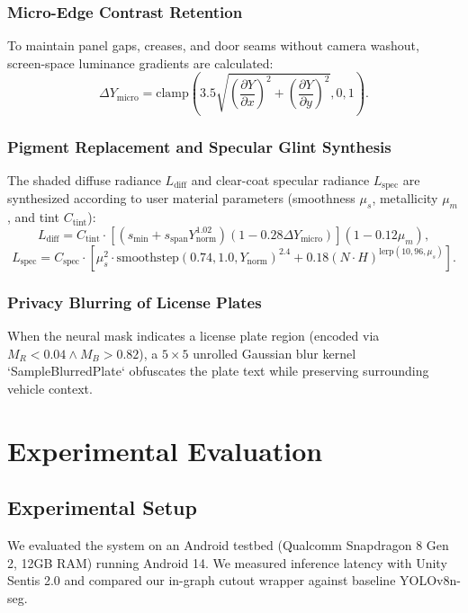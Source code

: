 \documentclass[10pt,journal,compsoc]{IEEEtran}
\begin{document}
\subsubsection{Micro-Edge Contrast Retention}
To maintain panel gaps, creases, and door seams without camera washout, screen-space luminance gradients are calculated:
\begin{equation}
    \Delta Y_{\text{micro}} = \text{clamp}\left(3.5 \sqrt{\left(\frac{\partial Y}{\partial x}\right)^2 + \left(\frac{\partial Y}{\partial y}\right)^2}, 0, 1\right).
\end{equation}

\subsubsection{Pigment Replacement and Specular Glint Synthesis}
The shaded diffuse radiance $L_{\text{diff}}$ and clear-coat specular radiance $L_{\text{spec}}$ are synthesized according to user material parameters (smoothness $\mu_s$, metallicity $\mu_m$, and tint $C_{\text{tint}}$):
\begin{equation}
    L_{\text{diff}} = C_{\text{tint}} \cdot \left[ (s_{\min} + s_{\text{span}} Y_{\text{norm}}^{1.02})(1 - 0.28 \Delta Y_{\text{micro}}) \right] (1 - 0.12 \mu_m),
\end{equation}
\begin{equation}
    L_{\text{spec}} = C_{\text{spec}} \cdot \left[ \mu_s^2 \cdot \text{smoothstep}(0.74, 1.0, Y_{\text{norm}})^{2.4} + 0.18 (N \cdot H)^{\text{lerp}(10, 96, \mu_s)} \right].
\end{equation}

\subsubsection{Privacy Blurring of License Plates}
When the neural mask indicates a license plate region (encoded via $M_R < 0.04 \land M_B > 0.82$), a $5 \times 5$ unrolled Gaussian blur kernel `SampleBlurredPlate` obfuscates the plate text while preserving surrounding vehicle context.

\section{Experimental Evaluation}

\subsection{Experimental Setup}
We evaluated the system on an Android testbed (Qualcomm Snapdragon 8 Gen 2, 12GB RAM) running Android 14. We measured inference latency with Unity Sentis 2.0 and compared our in-graph cutout wrapper against baseline YOLOv8n-seg.
\end{document}
